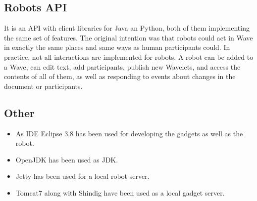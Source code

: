 \subsection{Robots API}
It is an API with client libraries for Java an Python, both of them implementing the same set of features. The original intention was that robots could act in Wave in exactly the same places and same ways as human participants could. In practice, not all interactions are implemented for robots. A robot can be added to a Wave, can edit text, add participants, publish new Wavelets, and access the contents of all of them, as well as responding to events about changes in the document or participants.

\subsection{Other}
\begin{itemize}
  \item As IDE Eclipse 3.8 has been used for developing the gadgets as well as the robot.
  \item OpenJDK has been used as JDK.
  \item Jetty has been used for a local robot server.
  \item Tomcat7 along with Shindig have been used as a local gadget server.
\end{itemize}



